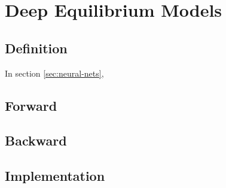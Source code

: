 \chapter{Deep Equilibrium Models}

\section{Definition}

In section \ref{sec:neural-nets}, 

\section{Forward}

\section{Backward}

\section{Implementation}

